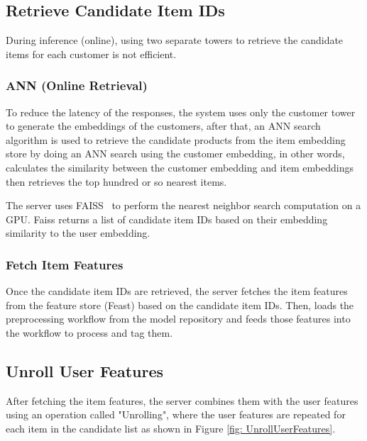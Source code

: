 \subsection{Retrieve Candidate Item IDs}

During inference (online), using two separate towers to retrieve the candidate items for each customer is not efficient.~\cite{NvidiaFeatureStores}

\subsubsection{ANN (Online Retrieval)}

To reduce the latency of the responses, the system uses only the customer tower to generate the embeddings of the customers,
after that, an ANN search algorithm is used to retrieve the candidate products from the item embedding store by doing an ANN search using the customer embedding, 
in other words, calculates the similarity between the customer embedding and item embeddings then retrieves the top hundred or so nearest items.


The server uses FAISS~\cite{Faiss} to perform the nearest neighbor search computation on a GPU.
Faiss returns a list of candidate item IDs based on their embedding similarity to the user embedding.

\subsubsection{Fetch Item Features}

Once the candidate item IDs are retrieved, the server fetches the item features from the feature store (Feast) based on the candidate item IDs.
Then, loads the preprocessing workflow from the model repository and feeds those features into the workflow to process and tag them.

\subsection{Unroll User Features}

After fetching the item features, the server combines them with the user features using an operation called "Unrolling", where the user features are repeated for each item in the candidate list as shown in Figure \ref{fig: UnrollUserFeatures}.


